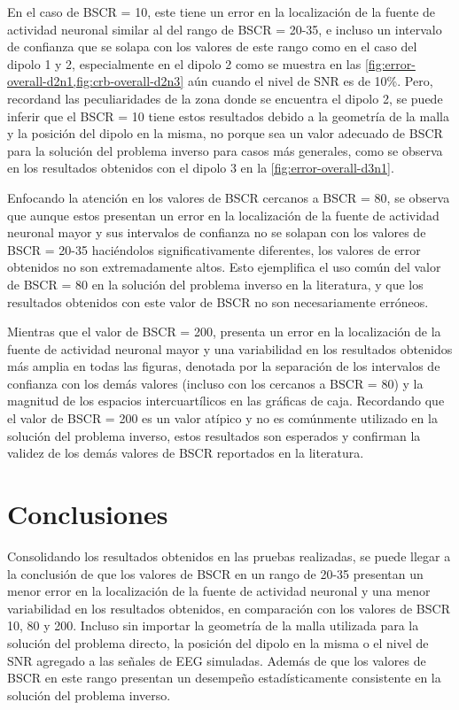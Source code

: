 En el caso de BSCR = 10, este tiene un error en la localización de la fuente de actividad neuronal similar al del rango de BSCR = 20-35, e incluso un intervalo de confianza que se solapa con los valores de este rango como en el caso del dipolo 1 y 2, especialmente en el dipolo 2 como se muestra en las \cref{fig:error-overall-d2n1,fig:crb-overall-d2n3} aún cuando el nivel de SNR es de 10\%.
Pero, recordand las peculiaridades de la zona donde se encuentra el dipolo 2, se puede inferir que el BSCR = 10 tiene estos resultados debido a la geometría de la malla y la posición del dipolo en la misma, no porque sea un valor adecuado de BSCR para la solución del problema inverso para casos más generales, como se observa en los resultados obtenidos con el dipolo 3 en la \cref{fig:error-overall-d3n1}.

Enfocando la atención en los valores de BSCR cercanos a BSCR = 80, se observa que aunque estos presentan un error en la localización de la fuente de actividad neuronal mayor y sus intervalos de confianza no se solapan con los valores de BSCR = 20-35 haciéndolos significativamente diferentes, los valores de error obtenidos no son extremadamente altos.
Esto ejemplifica el uso común del valor de BSCR = 80 en la solución del problema inverso en la literatura, y que los resultados obtenidos con este valor de BSCR no son necesariamente erróneos. 

Mientras que el valor de BSCR = 200, presenta un error en la localización de la fuente de actividad neuronal mayor y una variabilidad en los resultados obtenidos más amplia en todas las figuras, denotada por la separación de los intervalos de confianza con los demás valores (incluso con los cercanos a BSCR = 80) y la magnitud de los espacios intercuartílicos en las gráficas de caja.
Recordando que el valor de BSCR = 200 es un valor atípico y no es comúnmente utilizado en la solución del problema inverso, estos resultados son esperados y confirman la validez de los demás valores de BSCR reportados en la literatura. 

\section{Conclusiones}

Consolidando los resultados obtenidos en las pruebas realizadas, se puede llegar a la conclusión de que los valores de BSCR en un rango de 20-35 presentan un menor error en la localización de la fuente de actividad neuronal y una menor variabilidad en los resultados obtenidos, en comparación con los valores de BSCR 10, 80 y 200.
Incluso sin importar la geometría de la malla utilizada para la solución del problema directo, la posición del dipolo en la misma o el nivel de SNR agregado a las señales de EEG simuladas.
Además de que los valores de BSCR en este rango presentan un desempeño estadísticamente consistente en la solución del problema inverso.

